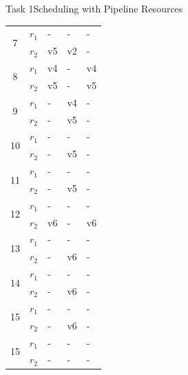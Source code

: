 \begin{frame}{Task 1}{Scheduling with Pipeline Resources}
\begin{solutionnoinc}
\begin{tabular}{c|c|l|l|l|}
      \hline \multirow{2}{*}{7}  & $r_1$ & -          & -          & -  \\
      \cline { 2 - 5 }           & $r_2$ & v5         & v2         & -  \\
      \hline \multirow{2}{*}{8}  & $r_1$ & v4         & -          & v4 \\
      \cline { 2 - 5 }           & $r_2$ & v5         & -          & v5 \\
      \hline \multirow{2}{*}{9}  & $r_1$ & -          & v4         & -  \\
      \cline { 2 - 5 }           & $r_2$ & -          & v5         & -  \\
      \hline \multirow{2}{*}{10} & $r_1$ & -          & -          & -  \\
      \cline { 2 - 5 }           & $r_2$ & -          & v5         & -  \\
      \hline \multirow{2}{*}{11} & $r_1$ & -          & -          & -  \\
      \cline { 2 - 5 }           & $r_2$ & -          & v5         & -  \\
      \hline \multirow{2}{*}{12} & $r_1$ & -          & -          & -  \\
      \cline { 2 - 5 }           & $r_2$ & v6         & -          & v6 \\
      \hline \multirow{2}{*}{13} & $r_1$ & -          & -          & -  \\
      \cline { 2 - 5 }           & $r_2$ & -          & v6         & -  \\
      \hline \multirow{2}{*}{14} & $r_1$ & -          & -          & -  \\
      \cline { 2 - 5 }           & $r_2$ & -          & v6         & -  \\
      \hline \multirow{2}{*}{15} & $r_1$ & -          & -          & -  \\
      \cline { 2 - 5 }           & $r_2$ & -          & v6         & -  \\
      \hline \multirow{2}{*}{15} & $r_1$ & -          & -          & -  \\
      \cline { 2 - 5 }           & $r_2$ & -          & -          & -  \\
      \hline
      \end{tabular}
  \end{solutionnoinc}
\end{frame}
